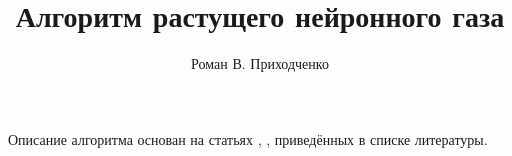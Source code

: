 \documentclass[unicode, 12pt, a4paper,oneside,fleqn]{article}
\author{Роман В. Приходченко}
\title{Алгоритм растущего нейронного газа}
\begin{document}
\renewcommand\bibname{СПИСОК ЛИТЕРАТУРЫ}
\renewcommand\refname{\centering Список литературы}
\renewcommand\contentsname{\centering Содержание}



\makeatletter %
\maketitle

\newpage
\tableofcontents

\newpage
Описание алгоритма основан на статьях \cite[A "Neural-Gas" Network Learns Topologies]{neural-gas-T.Martinetz-K.Schulten}, \cite[Нейронный газ]{ru.wikipedia.org}, \cite[Растущий нейронный газ - реализация на языке программирования MQL5]{gng-subbotin} приведённых в списке литературы.
\section{}



\newpage


\end{document}
